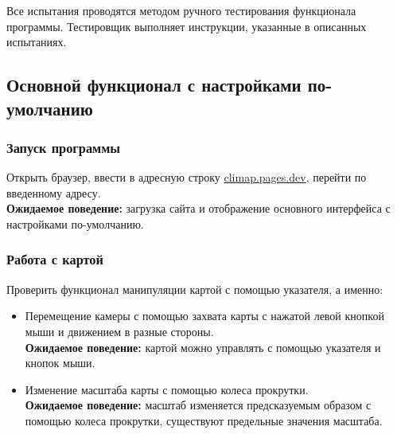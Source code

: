 \documentclass[a4paper, 12pt]{article}
\begin{document}
	Все испытания проводятся методом ручного тестирования функционала программы. Тестировщик выполняет инструкции,
	указанные в описанных испытаниях.

	\subsection{Основной функционал с настройками по-умолчанию}
	\subsubsection{Запуск программы}
	\label{subsubsection:6:1:1} Открыть браузер, ввести в адресную строку \href{https://climap.pages.dev}{climap.pages.dev},
	перейти по введенному адресу. \\ \textbf{Ожидаемое поведение:} загрузка сайта и отображение основного интерфейса с
	настройками по-умолчанию.

	\subsubsection{Работа с картой}
	Проверить функционал манипуляции картой с помощью указателя, а именно:
	\begin{itemize}
		\item Перемещение камеры с помощью захвата карты с нажатой левой кнопкой мыши и движением в разные стороны. \\
			\textbf{Ожидаемое поведение:} картой можно управлять с помощью указателя и кнопок мыши.

		\item Изменение масштаба карты с помощью колеса прокрутки. \\ \textbf{Ожидаемое поведение:} масштаб изменяется предсказуемым
			образом с помощью колеса прокрутки, существуют предельные значения масштаба.
	\end{itemize}
\end{document}
